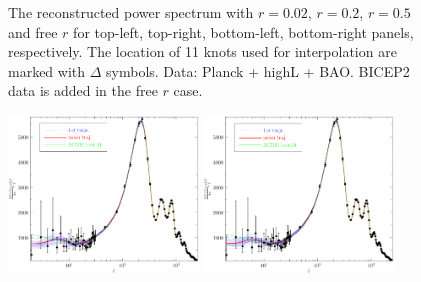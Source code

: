 \documentclass[11pt]{article}
\def \halffigwidth{0.45\textwidth}
\begin{document}
\begin{figure}
  \caption{The reconstructed power spectrum with $r = 0.02$, $r=0.2$, $r=0.5$ and free $r$ for top-left, top-right, bottom-left, bottom-right panels, respectively. The location of 11 knots used for interpolation are marked with $\Delta$ symbols. Data: Planck + highL + BAO. BICEP2 data is added in the free $r$ case. \label{fig:traj_power}}
\end{figure}



\begin{figure}
\includegraphics[width = \halffigwidth]{nobicep_spline0_p11_r0d02_clTT_trajs.pdf}%
\includegraphics[width = \halffigwidth]{nobicep_spline0_p11_r0d2_clTT_trajs.pdf}

\end{figure}
\end{document}
